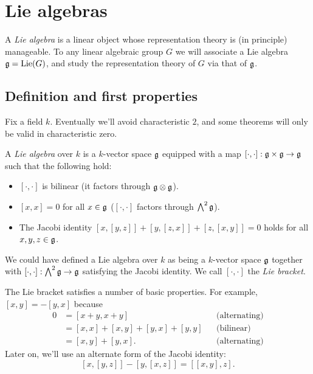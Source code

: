 
\section{Lie algebras}





A \emph{Lie algebra} is a linear object whose representation theory is (in 
principle) manageable. To any linear algebraic group $G$ we will associate a 
Lie algebra $\mathfrak{g}=\operatorname{Lie}(G)$, and study the representation theory of $G$ via that 
of $\mathfrak{g}$. 





\subsection{Definition and first properties}

Fix a field $k$. Eventually we'll avoid characteristic $2$, and some theorems 
will only be valid in characteristic zero. 

\begin{definition}
A \emph{Lie algebra} over $k$ is a $k$-vector space $\mathfrak{g}$ equipped with a map 
$[\cdot,\cdot]:\mathfrak{g}\times \mathfrak{g}\to \mathfrak{g}$ such that the following hold:
\begin{itemize}
  \item $[\cdot,\cdot]$ is bilinear (it factors through $\mathfrak{g}\otimes\mathfrak{g}$). 
  \item $[x,x]=0$ for all $x\in \mathfrak{g}$ ($[\cdot,\cdot]$ factors through 
    $\bigwedge^2 \mathfrak{g}$).
  \item The Jacobi identity $[x,[y,z]]+[y,[z,x]]+[z,[x,y]]=0$ holds for all 
    $x,y,z\in \mathfrak{g}$.  
\end{itemize}
\end{definition}

We could have defined a Lie algebra over $k$ as being a $k$-vector space 
$\mathfrak{g}$ together with $[\cdot,\cdot]:\bigwedge^2 \mathfrak{g}\to \mathfrak{g}$ satisfying the 
Jacobi identity. We call $[\cdot,\cdot]$ the \emph{Lie bracket}. 

The Lie bracket satisfies a number of basic properties. For example, 
$[x,y]=-[y,x]$ because 
\begin{align*}
  0 &= [x+y,x+y] && \text{(alternating)} \\
    &= [x,x]+[x,y]+[y,x]+[y,y] && \text{(bilinear)} \\
    &= [x,y] + [y,x] . && \text{(alternating)}
\end{align*}
Later on, we'll use an alternate form of the Jacobi identity: 
\begin{equation*}\label{eq:jac-ident}\tag{$*$}
  [x,[y,z]]-[y,[x,z]] = [[x,y],z] .
\end{equation*}





